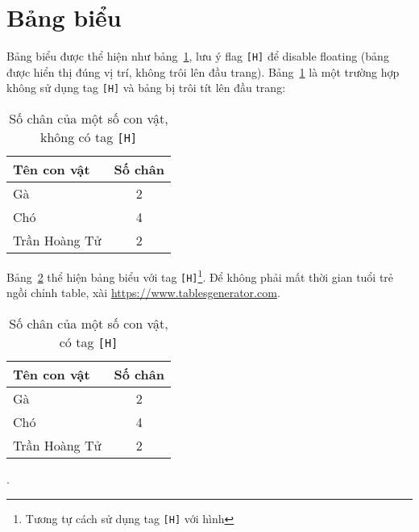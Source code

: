 \section{Bảng biểu}
Bảng biểu được thể hiện như bảng~\ref{tab:my_label}, lưu ý flag \texttt{[H]} để disable floating (bảng được hiển thị đúng vị trí, không trôi lên đầu trang). Bảng~\ref{tab:my_label} là một trường hợp không sử dụng tag \texttt{[H]} và bảng bị trôi tít lên đầu trang:
\begin{table}%
    \centering
    \begin{tabular}{lc}
        \toprule
        \textbf{Tên con vật} & \textbf{Số chân} \\ \midrule
        Gà                   & 2                \\ \midrule
        Chó                  & 4                \\ \midrule
        Trần Hoàng Tử        & 2                \\
        \bottomrule
    \end{tabular}
    \caption{Số chân của một số con vật, không có tag \texttt{[H]}}\label{tab:my_label}
\end{table}

Bảng~\ref{tab:my_label_with_H_tag} thể hiện bảng biểu với tag \texttt{[H]}\footnote{Tương tự cách sử dụng tag \texttt{[H]} với hình}. Để không phải mất thời gian tuổi trẻ ngồi chỉnh table, xài \href{https://www.tablesgenerator.com}{https://www.tablesgenerator.com}.

\begin{table}[H]
    \centering
    \begin{tabular}{l c}
        \toprule
        \textbf{Tên con vật} & \textbf{Số chân} \\ \midrule
        Gà                   & 2                \\ \midrule
        Chó                  & 4                \\ \midrule
        Trần Hoàng Tử        & 2                \\
        \bottomrule
    \end{tabular}
    \caption{Số chân của một số con vật, có tag \texttt{[H]}}\label{tab:my_label_with_H_tag}
\end{table}.